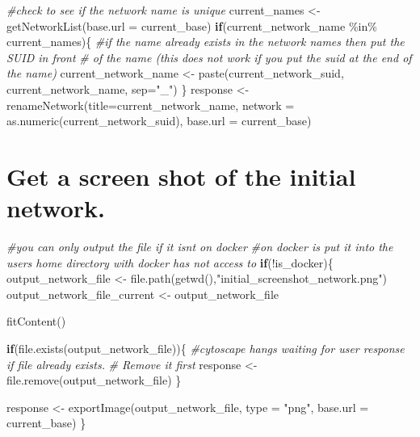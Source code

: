 \documentclass[
]{book}
\newenvironment{Shaded}{\begin{snugshade}}{\end{snugshade}}
\newcommand{\AttributeTok}[1]{\textcolor[rgb]{0.77,0.63,0.00}{#1}}
\newcommand{\CommentTok}[1]{\textcolor[rgb]{0.56,0.35,0.01}{\textit{#1}}}
\newcommand{\ControlFlowTok}[1]{\textcolor[rgb]{0.13,0.29,0.53}{\textbf{#1}}}
\newcommand{\FunctionTok}[1]{\textcolor[rgb]{0.00,0.00,0.00}{#1}}
\newcommand{\NormalTok}[1]{#1}
\newcommand{\OtherTok}[1]{\textcolor[rgb]{0.56,0.35,0.01}{#1}}
\newcommand{\SpecialCharTok}[1]{\textcolor[rgb]{0.00,0.00,0.00}{#1}}
\newcommand{\StringTok}[1]{\textcolor[rgb]{0.31,0.60,0.02}{#1}}
\begin{document}
\begin{Shaded}
\begin{Highlighting}[]
\CommentTok{\#check to see if the network name is unique}
\NormalTok{current\_names }\OtherTok{\textless{}{-}} \FunctionTok{getNetworkList}\NormalTok{(}\AttributeTok{base.url =}\NormalTok{ current\_base)}
\ControlFlowTok{if}\NormalTok{(current\_network\_name }\SpecialCharTok{\%in\%}\NormalTok{ current\_names)\{}
  \CommentTok{\#if the name already exists in the network names then put the SUID in front}
  \CommentTok{\# of the name (this does not work if you put the suid at the end of the name)}
\NormalTok{  current\_network\_name }\OtherTok{\textless{}{-}} \FunctionTok{paste}\NormalTok{(current\_network\_suid,}
\NormalTok{                                current\_network\_name,  }\AttributeTok{sep=}\StringTok{"\_"}\NormalTok{)}
\NormalTok{\}}
\NormalTok{response }\OtherTok{\textless{}{-}} \FunctionTok{renameNetwork}\NormalTok{(}\AttributeTok{title=}\NormalTok{current\_network\_name, }
                       \AttributeTok{network =} \FunctionTok{as.numeric}\NormalTok{(current\_network\_suid),}
                       \AttributeTok{base.url =}\NormalTok{ current\_base)}
\end{Highlighting}
\end{Shaded}

\hypertarget{get-a-screen-shot-of-the-initial-network.}{%
\section{Get a screen shot of the initial network.}\label{get-a-screen-shot-of-the-initial-network.}}

\begin{Shaded}
\begin{Highlighting}[]
\CommentTok{\#you can only output the file if it isn\textquotesingle{}t on docker}
\CommentTok{\#on docker is put it into the user\textquotesingle{}s home directory with docker has not access to}
\ControlFlowTok{if}\NormalTok{(}\SpecialCharTok{!}\NormalTok{is\_docker)\{}
\NormalTok{  output\_network\_file }\OtherTok{\textless{}{-}} \FunctionTok{file.path}\NormalTok{(}\FunctionTok{getwd}\NormalTok{(),}\StringTok{"initial\_screenshot\_network.png"}\NormalTok{)}
\NormalTok{  output\_network\_file\_current }\OtherTok{\textless{}{-}}\NormalTok{ output\_network\_file}

  \FunctionTok{fitContent}\NormalTok{()}

  \ControlFlowTok{if}\NormalTok{(}\FunctionTok{file.exists}\NormalTok{(output\_network\_file))\{}
    \CommentTok{\#cytoscape hangs waiting for user response if file already exists.  }
    \CommentTok{\# Remove it first}
\NormalTok{    response }\OtherTok{\textless{}{-}} \FunctionTok{file.remove}\NormalTok{(output\_network\_file)}
\NormalTok{  \} }

\NormalTok{  response }\OtherTok{\textless{}{-}} \FunctionTok{exportImage}\NormalTok{(output\_network\_file, }\AttributeTok{type =} \StringTok{"png"}\NormalTok{,}
                          \AttributeTok{base.url =}\NormalTok{ current\_base)}
\NormalTok{\}}
\end{Highlighting}
\end{Shaded}
\end{document}

